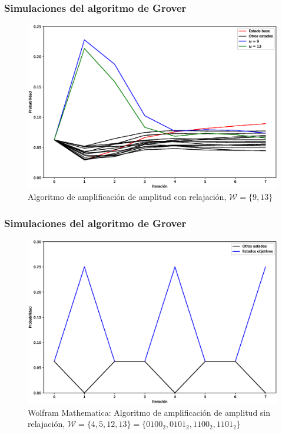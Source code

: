 \documentclass[xetex,mathserif,serif, 8pt]{beamer}
\begin{document}
\begin{frame}
    \frametitle{Simulaciones del algoritmo de Grover}
    \begin{figure}[H]
        \centering
        \includegraphics[width=0.99\linewidth]{img/grover2loss.eps}
        \caption{Algoritmo de amplificación de amplitud con relajación, $\mathcal{W} = \{9, 13\}$}
    \end{figure}
\end{frame}

\begin{frame}
    \frametitle{Simulaciones del algoritmo de Grover}
    \begin{figure}[H]
        \centering
        \includegraphics[width=0.9\linewidth]{img/grover3M.eps}
        \caption{Wolfram Mathematica: Algoritmo de amplificación de amplitud sin relajación, $\mathcal{W} = \{4, 5, 12, 13\} = \{0100_2, 0101_2, 1100_2, 1101_2\}$}
    \end{figure}
\end{frame}
\end{document}
